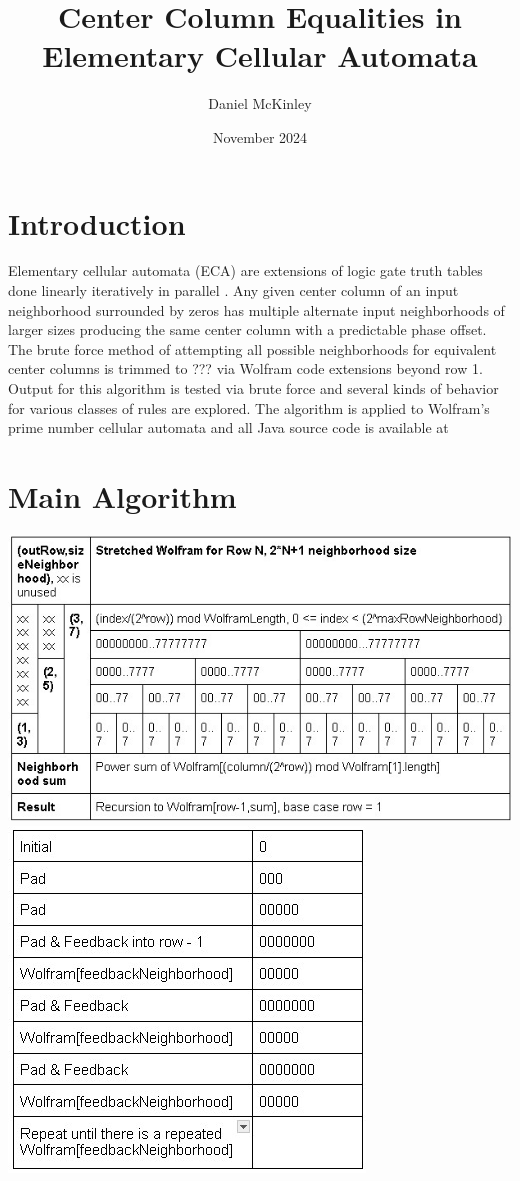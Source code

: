 \documentclass[11pt]{article}
\title{Center Column Equalities in Elementary Cellular Automata}
\date{November 2024}
\author{Daniel McKinley}
\begin{document}
    \maketitle


    \section{Introduction}
    Elementary cellular automata (ECA) are extensions of logic gate truth tables done linearly iteratively
    in parallel \cite{Wolfram}. Any given center column of an input neighborhood surrounded by
    zeros has multiple alternate input neighborhoods of larger sizes producing the same center
    column with a predictable phase offset. The brute force method of attempting all possible
    neighborhoods for equivalent center columns is trimmed to ??? via Wolfram code extensions
    beyond row 1. Output for this algorithm is tested via brute force and several kinds of behavior
    for various classes of rules are explored. The algorithm is applied to Wolfram's prime number
    cellular automata \cite{Wolfram} and all Java source code is available at \cite{mygit}\\
    \section{Main Algorithm}
    \begin{center}
    \includegraphics{RuleStretch}\\
    \includegraphics{StretchFeedback}
        \end{center}
\end{document}
